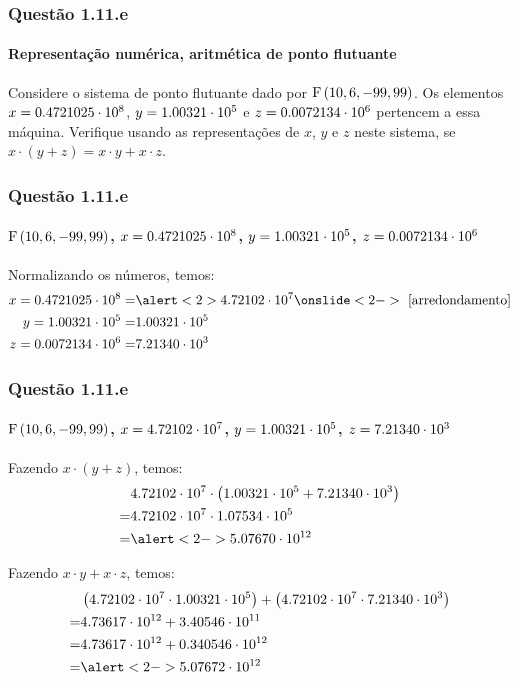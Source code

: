 \begin{frame}
\frametitle{Questão 1.11.e}
\framesubtitle{Representação numérica, aritmética de ponto flutuante}

Considere o sistema de ponto flutuante dado por $\mathrm{F}\left(10,6,-99,99\right)$. Os
elementos $x = 0.4721025 \cdot 10^{8}$, $y = 1.00321 \cdot 10^{5}$ e
$z = 0.0072134 \cdot 10^{6}$ pertencem a essa máquina. Verifique usando as
representações de $x$, $y$ e $z$ neste sistema, se $x \cdot (y + z) = x \cdot y
+ x \cdot z$.

\end{frame}

\begin{frame}
\frametitle{Questão 1.11.e}
\framesubtitle{$\mathrm{F}\left(10,6,-99,99\right)$, $x = 0.4721025 \cdot 10^{8} $,
$y = 1.00321 \cdot 10^{5} $, $z = 0.0072134 \cdot 10^{6} $}

Normalizando os números, temos:
\begin{align*}
x = \machinenumber{0.4721025}{8} =& \alert<2>{\machinenumber{4.72102}{7}}
\onslide<2->{\text{ [arredondamento]}}\\
y = \machinenumber{1.00321}{5} =& \machinenumber{1.00321}{5}\\
z = \machinenumber{0.0072134}{6} =& \machinenumber{7.21340}{3}\\
\end{align*}

\end{frame}

\begin{frame}
\frametitle{Questão 1.11.e}
\framesubtitle{$\mathrm{F}\left(10,6,-99,99\right)$, $x = 4.72102 \cdot 10^{7} $,
$y = 1.00321 \cdot 10^{5} $, $z = 7.21340 \cdot 10^{3} $}

Fazendo $x \cdot (y + z)$, temos:
\begin{align*}
& \machinenumber{4.72102}{7} \cdot \left(\machinenumber{1.00321}{5} +
\machinenumber{7.21340}{3} \right) \\
= & \machinenumber{4.72102}{7} \cdot \machinenumber{1.07534}{5} \\
= & \alert<2->{\machinenumber{5.07670}{12}}
\end{align*}

Fazendo $x \cdot y + x \cdot z$, temos:
\begin{align*}
& \left(\machinenumber{4.72102}{7} \cdot \machinenumber{1.00321}{5}\right) 
  +
  \left(\machinenumber{4.72102}{7} \cdot \machinenumber{7.21340}{3} \right) \\
= &  \machinenumber{4.73617}{12} + \machinenumber{3.40546}{11}\\
= & \machinenumber{4.73617}{12} + \machinenumber{0.340546}{12}\\
= & \alert<2->{\machinenumber{5.07672}{12}}
\end{align*}


\end{frame}

